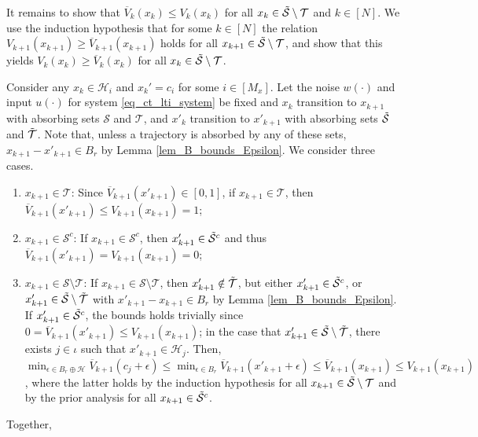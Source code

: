 \documentclass{IEEEtran}
\begin{document}
\begin{appendices}
It remains to show that $\overline{V}_k(x_k)\leq V_k(x_k)$ for all $x_k\in\Tilde{\mathcal{S}}\setminus\mathcal{T}$ and $k\in[N]$.  We use the induction hypothesis that for some $k\in[N]$ the relation $V_{k+1}(x_{k+1})\geq \overline{V}_{k+1}(x_{k+1})$ holds for all $x_{k+1}\in\Tilde{\mathcal{S}}\setminus\mathcal{T}$, and show that this yields $V_{k}(x_k)\geq \overline{V}_{k}(x_k)$ for all $x_k\in\Tilde{\mathcal{S}}\setminus\mathcal{T}$. 

Consider any $x_k\in\mathcal{H}_i$ and $x_k'=c_i$ for some $i\in[M_x]$. Let the noise $w(\cdot)$ and input $u(\cdot)$ for system \eqref{eq_ct_lti_system} be fixed and $x_k$ transition to $x_{k+1}$ with absorbing sets $\mathcal{S}$ and $\mathcal{T}$, and $x'_k$ transition to $x'_{k+1}$ with absorbing sets $\Tilde{\mathcal{S}}$ and $\Tilde{\mathcal{T}}$. Note that, unless a trajectory is absorbed by any of these sets, $x_{k+1}-x'_{k+1}\in B_r$ by Lemma \ref{lem_B_bounds_Epsilon}. 
We consider three cases.
\begin{enumerate}
    \item $x_{k+1}\in\mathcal{T}$: Since $\overline{V}_{k+1}(x'_{k+1})\in[0,1]$, if $x_{k+1}\in\mathcal{T}$, then $\overline{V}_{k+1}(x'_{k+1})\leq V_{k+1}(x_{k+1})=1$;
    \item $x_{k+1}\in\mathcal{S}^c$: If $x_{k+1}\in\mathcal{S}^c$, then $x'_{k+1}\in\Tilde{\mathcal{S}}^c$ and thus $\overline{V}_{k+1}(x'_{k+1})=V_{k+1}(x_{k+1})=0$;
    \item $x_{k+1}\in\mathcal{S}\setminus\mathcal{T}$: If $x_{k+1}\in\mathcal{S}\setminus\mathcal{T}$, then $x'_{k+1}\notin \Tilde{\mathcal{T}}$, but either $x'_{k+1}\in\Tilde{\mathcal{S}}^c$, or $x'_{k+1}\in\Tilde{\mathcal{S}}\setminus\Tilde{\mathcal{T}}$ with $x'_{k+1}-x_{k+1}\in B_r$ by Lemma \ref{lem_B_bounds_Epsilon}. If $x'_{k+1}\in\Tilde{\mathcal{S}}^c$, the bounds holds trivially since $0=\overline{V}_{k+1}(x'_{k+1})\leq V_{k+1}(x_{k+1})$; in the case that $x'_{k+1}\in\Tilde{\mathcal{S}}\setminus\Tilde{\mathcal{T}}$, there exists $j\in\iota$ such that $x'_{k+1}\in\mathcal{H}_j$. Then, $\min_{\epsilon\in B_r\oplus\mathcal{H}}\overline{V}_{k+1}(c_j+\epsilon)\leq \min_{\epsilon\in B_r}\overline{V}_{k+1}(x'_{k+1}+\epsilon)\leq \overline{V}_{k+1}(x_{k+1})\leq {V}_{k+1}(x_{k+1})$, where the latter holds by the induction hypothesis for all $x_{k+1}\in\Tilde{\mathcal{S}}\setminus\mathcal{T}$ and by the prior analysis for all $x_{k+1}\in\Tilde{\mathcal{S}}^c$.
\end{enumerate}
Together, 
\begin{subequations}

\end{subequations}
\end{appendices}
\end{document}
